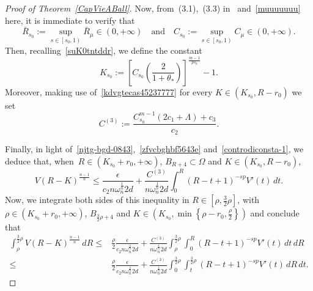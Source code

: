 \documentclass[12pt]{article}
\numberwithin{equation}{section}
\renewcommand{\leq}{\leqslant}
\begin{document}
\begin{proof}[Proof of Theorem~\ref{CapVieABall}]
Now, from~(3.1),~(3.3) in~\cite{DFVERPP}
and~\eqref{muuuuuuu} here, it is immediate to verify that
\begin{equation}\label{controdiconsta-1}
\bar{R}_{s_0}:=\sup_{s\in \left[s_0,1\right)} \bar{R}_\mu\in (0,+\infty) \quad\mbox{and}\quad C_{s_0}:=\sup_{s\in\left[s_0,1\right)}C_\mu\in(0,+\infty).
\end{equation} 
Then, recalling~\eqref{suK0tntddr}, we define the constant
\begin{equation*}
K_{s_0}:= \left[C_{s_0}\left(\frac{2}{1+\theta_*}\right)\right]^\frac{m-1}{p s_0}-1.
\end{equation*}
Moreover, making use of~\eqref{kdvgtecas45237777}  for every $K\in (K_{s_0},R-r_0)$ we set
\begin{equation*}
C^{(3)}:=\frac{C_{s_0}^{m-1}(2c_1+\Lambda)+c_3}{c_2}. 
\end{equation*}

Finally, in light of~\eqref{njtg-bgd-0843},~\eqref{zfvcbghbf5643e}  and~\eqref{controdiconsta-1}, we deduce that, when~$R\in \left(K_{s_0}+r_0,+\infty \right)$, $B_{R+4}\subset\Omega$ and $K\in (K_{s_0},R-r_0)$,
\begin{equation*}
V(R-K)^{\frac{n-1}{n}}\leq \frac{\epsilon}{c_2 n\omega_n^{\frac{1}{n}} 2d}+\frac{C^{(3)}}{n\omega_n^{\frac{1}{n}} 2d}\int_{0}^R \left(R-t+1\right)^{-sp}V'(t)\,dt.
\end{equation*}
Now, we integrate both sides of this inequality in $R\in \left[\rho,\frac{3}{2}\rho\right]$, with $\rho \in \left( K_{s_0}+r_0,+\infty\right)$, $B_{\frac{3}{2}\rho+4}$ and $K\in \left(K_{s_0}, \min \left\lbrace\rho-r_0,\frac{\rho}{2} \right\rbrace\right)$ and conclude that 
\begin{equation*}
\begin{split}
\int_{\rho}^{\frac{3}{2}\rho} V(R-K)^\frac{n-1}{n}\,dR \leq &\frac{\rho}{2}\frac{\epsilon}{c_2 n\omega_n^{\frac{1}{n}} 2d}+ \frac{C^{(3)}}{n\omega_n^\frac{1}{n} 2d}\int_{\rho}^{\frac{3}{2}\rho}\int_{0}^R \left(R-t+1\right)^{-sp}V'(t)\,dt\,dR\\
\leq & \frac{\rho}{2}\frac{\epsilon}{c_2 n\omega_n^{\frac{1}{n}} 2d}+\frac{C^{(3)}}{n\omega_n^\frac{1}{n} 2d}\int_{0}^{\frac{3}{2}\rho}\int_{t}^{\frac{3}{2}\rho} \left(R-t+1\right)^{-sp}V'(t)\,dR\,dt. 
\end{split}
\end{equation*}


\end{proof}
\end{document}
